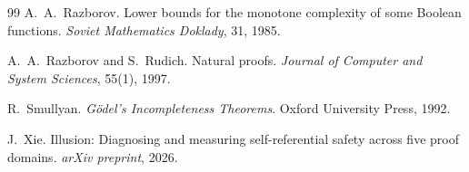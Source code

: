 \documentclass[11pt,a4paper]{article}
\theoremstyle{plain}
\theoremstyle{definition}
\theoremstyle{remark}
\begin{document}
\begin{thebibliography}{99}
A.~A.~Razborov.
\newblock Lower bounds for the monotone complexity of some Boolean functions.
\newblock \emph{Soviet Mathematics Doklady}, 31, 1985.

A.~A.~Razborov and S.~Rudich.
\newblock Natural proofs.
\newblock \emph{Journal of Computer and System Sciences}, 55(1), 1997.

R.~Smullyan.
\newblock \emph{G\"{o}del's Incompleteness Theorems}.
\newblock Oxford University Press, 1992.

J.~Xie.
\newblock Illusion: Diagnosing and measuring self-referential safety across five proof domains.
\newblock \emph{arXiv preprint}, 2026.

\end{thebibliography}
\end{document}
